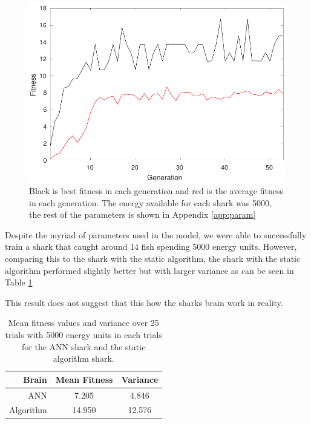 \begin{figure}
\centering
\includegraphics[width=.7\textwidth]{figs/fitness.pdf}
\caption{\label{fig:fitness} Black is best fitness in each generation and red is the average fitness in each generation. The energy available for each shark was 5000, the rest of the parameters is shown in Appendix \ref{app:param}}
\end{figure}

Despite the myriad of parameters used in the model, we were able to successfully train a shark that caught around 14 fish spending 5000 energy units. However, comparing this to the shark with the static algorithm, the shark with the static algorithm performed slightly better but with larger variance as can be seen in Table \ref{tab:fitness} 

This result does not suggest that this how the sharks brain work in reality.
\begin{table}
\centering
\begin{tabular}{r|c|c} 
Brain & Mean Fitness & Variance \\ \hline
ANN   & 7.205        & 4.846    \\ \hline
Algorithm & 14.950   & 12.576   \\ \hline
\end{tabular} 
\caption{\label{tab:fitness} Mean fitness values and variance over 25 trials with 5000 energy units in each trials for the ANN shark and the static algorithm shark.}
\end{table}

